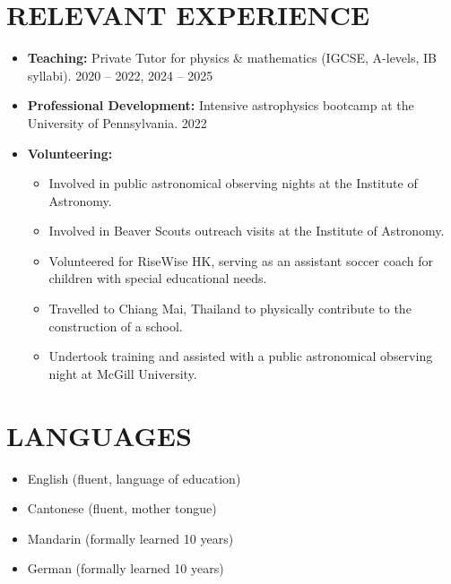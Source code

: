 \documentclass[a4paper,10pt]{extarticle}
\begin{document}
\section*{RELEVANT EXPERIENCE}
\begin{itemize}
    \item \textbf{Teaching:} Private Tutor for physics \& mathematics (IGCSE, A-levels, IB syllabi). \hfill 2020 – 2022, 2024 – 2025
    \item \textbf{Professional Development:} Intensive astrophysics bootcamp at the University of Pennsylvania. \hfill 2022
    \item \textbf{Volunteering:}
    \begin{itemize}
        \item Involved in public astronomical observing nights at the Institute of Astronomy.
        \item Involved in Beaver Scouts outreach visits at the Institute of Astronomy.
        \item Volunteered for RiseWise HK, serving as an assistant soccer coach for children with special educational needs.
        \item Travelled to Chiang Mai, Thailand to physically contribute to the construction of a school.
        \item Undertook training and assisted with a public astronomical observing night at McGill University.
    \end{itemize}
\end{itemize}


\section*{LANGUAGES}
\begin{itemize}
    \item English (fluent, language of education)

    \item Cantonese (fluent, mother tongue)

    \item Mandarin (formally learned 10 years)

    \item German (formally learned 10 years)
\end{itemize}

\end{document}
